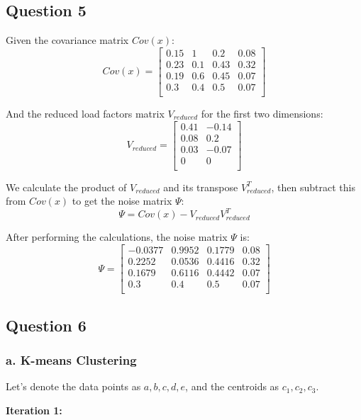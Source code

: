 \documentclass{article}
\begin{document}
\subsection*{Question 5}

Given the covariance matrix \(Cov(x)\):
\[
Cov(x) = \begin{bmatrix}
0.15 & 1 & 0.2 & 0.08 \\
0.23 & 0.1 & 0.43 & 0.32 \\
0.19 & 0.6 & 0.45 & 0.07 \\
0.3 & 0.4 & 0.5 & 0.07 \\
\end{bmatrix}
\]

And the reduced load factors matrix \(V_{reduced}\) for the first two dimensions:
\[
V_{reduced} = \begin{bmatrix}
0.41 & -0.14 \\
0.08 & 0.2 \\
0.03 & -0.07 \\
0 & 0 \\
\end{bmatrix}
\]

We calculate the product of \(V_{reduced}\) and its transpose \(V_{reduced}^T\), then subtract this from \(Cov(x)\) to get the noise matrix \(\Psi\):
\[
\Psi = Cov(x) - V_{reduced} V_{reduced}^T
\]

After performing the calculations, the noise matrix \(\Psi\) is:
\[
\Psi = \begin{bmatrix}
-0.0377 & 0.9952 & 0.1779 & 0.08 \\
0.2252 & 0.0536 & 0.4416 & 0.32 \\
0.1679 & 0.6116 & 0.4442 & 0.07 \\
0.3 & 0.4 & 0.5 & 0.07 \\
\end{bmatrix}
\]

\subsection*{Question 6}

\subsubsection*{a. K-means Clustering}

Let's denote the data points as $a, b, c, d, e$, and the centroids as $c_1, c_2, c_3$.

\textbf{Iteration 1:}
\end{document}

